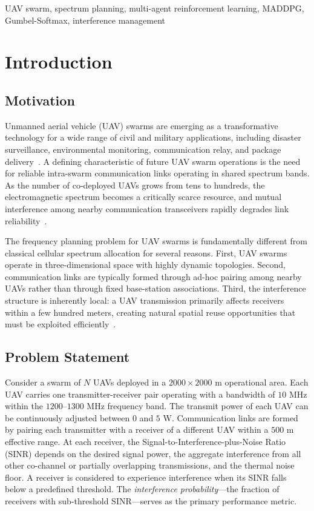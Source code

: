 \documentclass[conference]{IEEEtran}
\begin{document}
\begin{IEEEkeywords}
UAV swarm, spectrum planning, multi-agent reinforcement learning, MADDPG, Gumbel-Softmax, interference management
\end{IEEEkeywords}

\section{Introduction}

\subsection{Motivation}
Unmanned aerial vehicle (UAV) swarms are emerging as a transformative technology for a wide range of civil and military applications, including disaster surveillance, environmental monitoring, communication relay, and package delivery~\cite{ref_uav_swarm_app1,ref_uav_swarm_app2}. A defining characteristic of future UAV swarm operations is the need for reliable intra-swarm communication links operating in shared spectrum bands. As the number of co-deployed UAVs grows from tens to hundreds, the electromagnetic spectrum becomes a critically scarce resource, and mutual interference among nearby communication transceivers rapidly degrades link reliability~\cite{ref_uav_com1,ref_uav_com2}.

The frequency planning problem for UAV swarms is fundamentally different from classical cellular spectrum allocation for several reasons. First, UAV swarms operate in three-dimensional space with highly dynamic topologies. Second, communication links are typically formed through ad-hoc pairing among nearby UAVs rather than through fixed base-station associations. Third, the interference structure is inherently local: a UAV transmission primarily affects receivers within a few hundred meters, creating natural spatial reuse opportunities that must be exploited efficiently~\cite{ref_uav_com3}.

\subsection{Problem Statement}
Consider a swarm of $N$ UAVs deployed in a $2000 \times 2000$ m operational area. Each UAV carries one transmitter-receiver pair operating with a bandwidth of $10$ MHz within the $1200$--$1300$ MHz frequency band. The transmit power of each UAV can be continuously adjusted between $0$ and $5$ W. Communication links are formed by pairing each transmitter with a receiver of a different UAV within a $500$ m effective range. At each receiver, the Signal-to-Interference-plus-Noise Ratio (SINR) depends on the desired signal power, the aggregate interference from all other co-channel or partially overlapping transmissions, and the thermal noise floor. A receiver is considered to experience interference when its SINR falls below a predefined threshold. The \emph{interference probability}---the fraction of receivers with sub-threshold SINR---serves as the primary performance metric.
\end{document}
